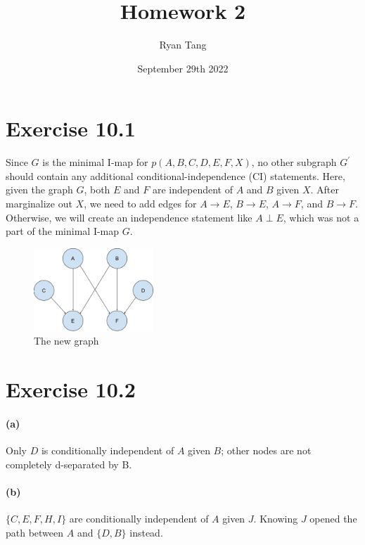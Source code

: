 \documentclass[11pt, letterpaper]{article}
\title{Homework 2}
\author{Ryan Tang}
\date{September 29th 2022}
\begin{document}
\maketitle

\section{Exercise 10.1}
Since $G$ is the minimal I-map for $p(A, B, C, D, E, F, X)$, no other subgraph $G^{\prime}$ should contain any additional conditional-independence (CI) statements. Here, given the graph $G$, both $E$ and $F$ are independent of $A$ and $B$ given $X$. After marginalize out $X$, we need to add edges for $A \rightarrow E$, $B \rightarrow E$, $A \rightarrow F$, and $B \rightarrow F$. Otherwise, we will create an independence statement like $A \perp E$, which was not a part of the minimal I-map $G$.

\begin{figure}[!h]
  \centering
  \includegraphics[width=0.4\textwidth]{hw2/10.1.png}
  \captionsetup{justification=centering}
  \caption{The new graph}
\end{figure}

\section{Exercise 10.2}
\paragraph{(a)} Only $D$ is conditionally independent of $A$ given $B$; other nodes are not completely d-separated by B.
\paragraph{(b)} $\{C, E, F, H, I\}$ are conditionally independent of $A$ given $J$. Knowing $J$ opened the path between $A$ and $\{D, B\}$ instead.
\end{document}
